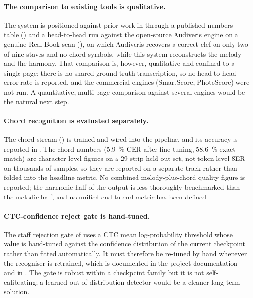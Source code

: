 \paragraph{The comparison to existing tools is qualitative.}
The system is positioned against prior work in 
through a published-numbers table () and a
head-to-head run against the open-source Audiveris engine on a genuine
Real Book scan (), on which Audiveris
recovers a correct clef on only two of nine staves and no chord symbols,
while this system reconstructs the melody and the harmony.
That comparison is, however, qualitative and confined to a single page:
there is no shared ground-truth transcription, so no head-to-head error
rate is reported, and the commercial engines (SmartScore, PhotoScore)
were not run.
A quantitative, multi-page comparison against several engines would be
the natural next step.

\paragraph{Chord recognition is evaluated separately.}
The chord stream () is trained and wired into the
pipeline, and its accuracy is reported in .
The chord numbers (\SI{5.9}{\percent} CER after fine-tuning,
\SI{58.6}{\percent} exact-match) are character-level figures on a
\num{29}-strip held-out set, not token-level SER on thousands of
samples, so they are reported on a separate track rather than folded
into the headline metric.
No combined melody-plus-chord quality figure is reported; the harmonic
half of the output is less thoroughly benchmarked than the melodic half,
and no unified end-to-end metric has been defined.

\paragraph{CTC-confidence reject gate is hand-tuned.}
The staff rejection gate of  uses a
CTC mean log-probability threshold whose value is hand-tuned against
the confidence distribution of the current checkpoint rather than
fitted automatically.
It must therefore be re-tuned by hand whenever the recogniser is
retrained, which is documented in the project documentation and in
.
The gate is robust within a checkpoint family but it is not
self-calibrating; a learned out-of-distribution detector would be a
cleaner long-term solution.

